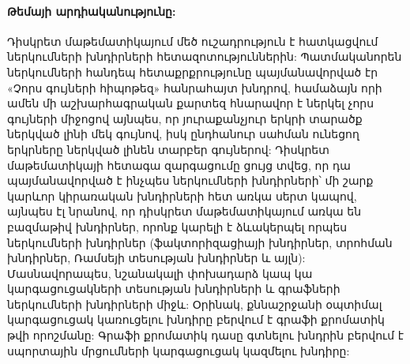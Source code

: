 \paragraph{Թեմայի արդիականությունը:} 

Դիսկրետ մաթեմատիկայում մեծ ուշադրություն է հատկացվում ներկումների խնդիրների հետազոտություններին: Պատմականորեն ներկումների հանդեպ հետաքրքրությունը պայմանավորված էր «Չորս գույների հիպոթեզ» հանրահայտ խնդրով, համաձայն որի ամեն մի աշխարհագրական քարտեզ հնարավոր է ներկել չորս գույների միջոցով այնպես, որ յուրաքանչյուր երկրի տարածք ներկված լինի մեկ գույնով, իսկ ընդհանուր սահման ունեցող երկրները ներկված լինեն տարբեր գույներով: Դիսկրետ մաթեմատիկայի հետագա զարգացումը ցույց տվեց, որ դա պայմանավորված է ինչպես ներկումների խնդիրների՝ մի շարք կարևոր կիրառական խնդիրների հետ առկա սերտ կապով, այնպես էլ նրանով, որ դիսկրետ մաթեմատիկայում առկա են բազմաթիվ խնդիրներ, որոնք կարելի է ձևակերպել որպես ներկումների խնդիրներ (ֆակտորիզացիայի խնդիրներ, տրոհման խնդիրներ, Ռամսեյի տեսության խնդիրներ և այլն): Մասնավորապես, նշանակալի փոխադարձ կապ կա կարգացուցակների տեսության խնդիրների և գրաֆների ներկումների խնդիրների միջև: Օրինակ, քննաշրջանի օպտիմալ կարգացուցակ կառուցելու խնդիրը բերվում է գրաֆի քրոմատիկ թվի որոշմանը: Գրաֆի քրոմատիկ դասը գտնելու խնդրին բերվում է սպորտային մրցումների կարգացուցակ կազմելու խնդիրը:

